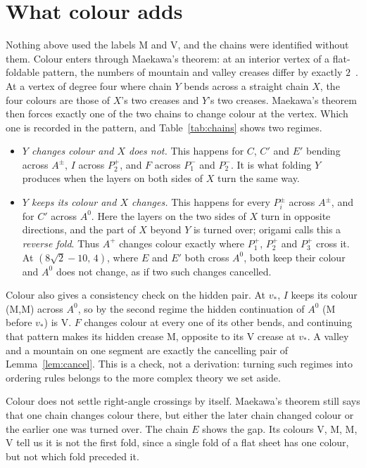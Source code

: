 \documentclass[11pt]{article}
\theoremstyle{definition}
\theoremstyle{remark}
\newcommand{\vstar}{v_\ast}
\begin{document}
\section{What colour adds}\label{sec:colour}

Nothing above used the labels M and V, and the chains were identified without them. Colour enters through Maekawa's theorem: at an interior vertex of a flat-foldable pattern, the numbers of mountain and valley creases differ by exactly $2$~\cite{hull}. At a vertex of degree four where chain $Y$ bends across a straight chain $X$, the four colours are those of $X$'s two creases and $Y$'s two creases. Maekawa's theorem then forces exactly one of the two chains to change colour at the vertex. Which one is recorded in the pattern, and Table~\ref{tab:chains} shows two regimes.
\begin{itemize}
\item \emph{$Y$ changes colour and $X$ does not.} This happens for $C$, $C'$ and $E'$ bending across $A^{\pm}$, $I$ across $P_2^+$, and $F$ across $P_1^-$ and $P_2^-$. It is what folding $Y$ produces when the layers on both sides of $X$ turn the same way.
\item \emph{$Y$ keeps its colour and $X$ changes.} This happens for every $P_i^{\pm}$ across $A^{\pm}$, and for $C'$ across $A^0$. Here the layers on the two sides of $X$ turn in opposite directions, and the part of $X$ beyond $Y$ is turned over; origami calls this a \emph{reverse fold}. Thus $A^{+}$ changes colour exactly where $P_1^+$, $P_2^+$ and $P_3^+$ cross it. At $(8\sqrt2-10,\,4)$, where $E$ and $E'$ both cross $A^0$, both keep their colour and $A^0$ does not change, as if two such changes cancelled.
\end{itemize}

Colour also gives a consistency check on the hidden pair. At $\vstar$, $I$ keeps its colour (M,M) across $A^0$, so by the second regime the hidden continuation of $A^0$ (M before $\vstar$) is V. $F$ changes colour at every one of its other bends, and continuing that pattern makes its hidden crease M, opposite to its V crease at $\vstar$. A valley and a mountain on one segment are exactly the cancelling pair of Lemma~\ref{lem:cancel}. This is a check, not a derivation: turning such regimes into ordering rules belongs to the more complex theory we set aside.

Colour does not settle right-angle crossings by itself. Maekawa's theorem still says that one chain changes colour there, but either the later chain changed colour or the earlier one was turned over. The chain $E$ shows the gap. Its colours V, M, M, V tell us it is not the first fold, since a single fold of a flat sheet has one colour, but not which fold preceded it.
\end{document}
